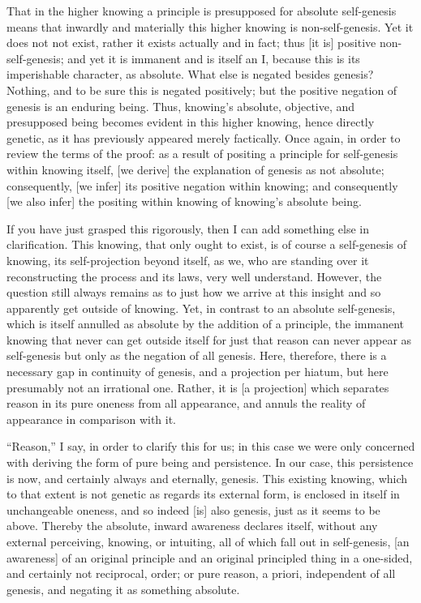 That in the higher knowing
a principle is presupposed for absolute self-genesis
means that inwardly and materially
this higher knowing is non-self-genesis.
Yet it does not not exist,
rather it exists actually and in fact;
thus [it is] positive non-self-genesis;
and yet it is immanent and is itself an I,
because this is its imperishable character, as absolute.
What else is negated besides genesis?
Nothing, and to be sure this is negated positively;
but the positive negation of genesis is an enduring being.
Thus, knowing's absolute, objective,
and presupposed being becomes evident
in this higher knowing, hence directly genetic,
as it has previously appeared merely factically.
Once again, in order to review the terms of the proof:
as a result of positing a principle
for self-genesis within knowing itself,
[we derive] the explanation of genesis as not absolute;
consequently, [we infer] its positive negation within knowing;
and consequently [we also infer] the positing within knowing
of knowing's absolute being.

If you have just grasped this rigorously,
then I can add something else in clarification.
This knowing, that only ought to exist, is of course
a self-genesis of knowing, its self-projection beyond itself,
as we, who are standing over it reconstructing
the process and its laws, very well understand.
However, the question still always remains as
to just how we arrive at this insight
and so apparently get outside of knowing.
Yet, in contrast to an absolute self-genesis,
which is itself annulled as absolute
by the addition of a principle,
the immanent knowing that never can get outside itself
for just that reason can never appear as self-genesis
but only as the negation of all genesis.
Here, therefore, there is a necessary gap
in continuity of genesis,
and a projection per hiatum,
but here presumably not an irrational one.
Rather, it is [a projection] which separates
reason in its pure oneness from all appearance,
and annuls the reality of appearance in comparison with it.

“Reason,” I say, in order to clarify this for us;
in this case we were only concerned with deriving
the form of pure being and persistence.
In our case, this persistence is now,
and certainly always and eternally, genesis.
This existing knowing, which to that extent
is not genetic as regards its external form,
is enclosed in itself in unchangeable oneness,
and so indeed [is] also genesis,
just as it seems to be above.
Thereby the absolute, inward awareness declares itself,
without any external perceiving, knowing, or intuiting,
all of which fall out in self-genesis,
[an awareness] of an original principle
and an original principled thing
in a one-sided, and certainly not reciprocal, order;
or pure reason, a priori,
independent of all genesis,
and negating it as something absolute.

